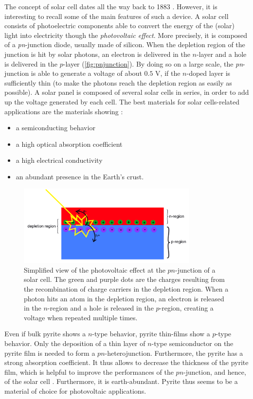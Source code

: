 \documentclass[11pt,a4paper]{article}
\begin{document}
The concept of solar cell dates all the way back to 1883 \cite{solarcellinvention}. However, it is interesting to recall some of the main features of such a device. A solar cell consists of photoelectric components able to convert the energy of the (solar) light into electricity though the \textit{photovoltaic effect}. More precisely, it is composed of a \textit{pn}-junction diode, usually made of silicon. When the depletion region of the junction is hit by solar photons, an electron is delivered in the $n$-layer and a hole is delivered in the $p$-layer (\autoref{fig:pnjunction}). By doing so on a large scale, the \textit{pn}-junction is able to generate a voltage of about $0.5$ V, if the $n$-doped layer is sufficiently thin (to make the photons reach the depletion region as easily as possible). A solar panel is composed of several solar cells in series, in order to add up the voltage generated by each cell. The best materials for solar cells-related applications are the materials showing :
\begin{itemize}
\item a semiconducting behavior
\item a high optical absorption coefficient
\item a high electrical conductivity
\item an abundant presence in the Earth's crust.\cite{solarCell}
\end{itemize}
\begin{figure}[H]
\centering
\includegraphics[width=0.8\textwidth]{images/pnjunction.png}
\caption{Simplified view of the photovoltaic effect at the $pn$-junction of a solar cell. The green and purple dots are the charges resulting from the recombination of charge carriers in the depletion region. When a photon hits an atom in the depletion region, an electron is released in the $n$-region and a hole is released in the $p$-region, creating a voltage when repeated multiple times.}
\label{fig:pnjunction}
\end{figure}
Even if bulk pyrite shows a $n$-type behavior, pyrite thin-films show a $p$-type behavior. Only the deposition of a thin layer of $n$-type semiconductor on the pyrite film is needed to form a $pn$-heterojunction. Furthermore, the pyrite has a strong absorption coefficient. It thus allows to decrease the thickness of the pyrite film, which is helpful to improve the performances of the $pn$-junction, and hence, of the solar cell \cite{thinFilms}. Furthermore, it is earth-abundant. Pyrite thus seems to be a material of choice for photovoltaic applications.
\end{document}
